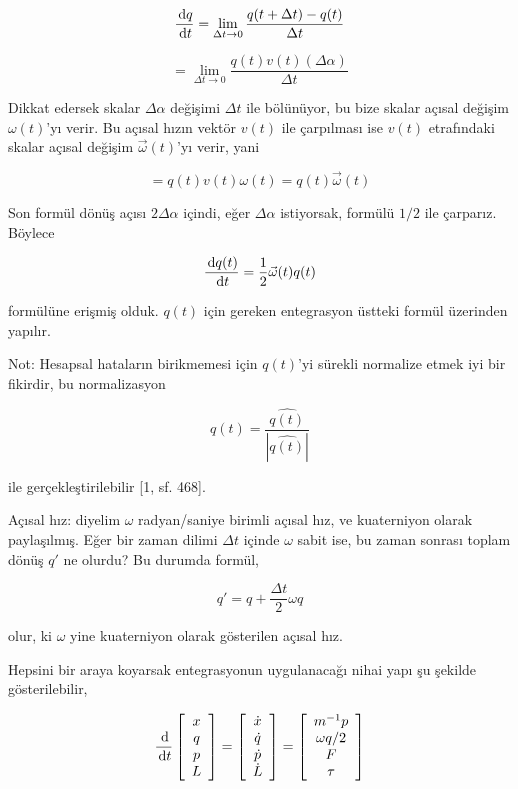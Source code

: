 \documentclass[12pt,fleqn]{article}\usepackage{../../common}
\begin{document}
$$
\frac{\,\mathrm{d} q}{\,\mathrm{d} t} = \lim_{\Delta t \to 0} \frac{q(t + \Delta t) - q(t)}{\Delta t}
$$

$$
= \lim_{\Delta t \to 0} \frac{q(t) v(t) (\Delta \alpha)}{\Delta t}
$$

Dikkat edersek skalar $\Delta \alpha$ değişimi $\Delta t$ ile bölünüyor, bu bize
skalar açısal değişim $\omega(t)$'yı verir. Bu açısal hızın vektör $v(t)$ ile
çarpılması ise $v(t)$ etrafındaki skalar açısal değişim $\vec{\omega}(t)$'yı
verir, yani

$$
= q(t) v(t) \omega(t) = q(t) \vec{\omega}(t)
$$

Son formül dönüş açısı $2 \Delta \alpha$ içindi, eğer $\Delta \alpha$
istiyorsak, formülü $1/2$ ile çarparız. Böylece 

$$
\frac{\,\mathrm{d} q(t)}{\,\mathrm{d} t} = \frac{1}{2} \vec{\omega}(t) q(t)
$$

formülüne erişmiş olduk. $q(t)$ için gereken entegrasyon üstteki formül
üzerinden yapılır.

Not: Hesapsal hataların birikmemesi için $q(t)$'yi sürekli normalize etmek
iyi bir fikirdir, bu normalizasyon

$$
q(t) = \frac{\hat{q(t)}}{|\hat{q(t)}|}
$$

ile gerçekleştirilebilir [1, sf. 468].

Açısal hız: diyelim $\omega$ radyan/saniye birimli açısal hız, ve kuaterniyon
olarak paylaşılmış. Eğer bir zaman dilimi $\Delta t$ içinde $\omega$ sabit ise,
bu zaman sonrası toplam dönüş $q'$ ne olurdu? Bu durumda formül,

$$
q' = q + \frac{\Delta t}{2} \omega q
$$

olur, ki $\omega$ yine kuaterniyon olarak gösterilen açısal hız.

Hepsini bir araya koyarsak entegrasyonun uygulanacağı nihai yapı şu şekilde
gösterilebilir,

$$
\frac{\,\mathrm{d}}{\,\mathrm{d} t}
\left[\begin{array}{c}
x \\ q \\ p  \\ L
\end{array}\right] =
\left[\begin{array}{c}
\dot{x} \\ \dot{q} \\ \dot{p}  \\ \dot{L}
\end{array}\right] =
\left[\begin{array}{ccc}
m^{-1} p \\ \omega q / 2 \\ F \\ \tau
\end{array}\right]
$$
\end{document}

